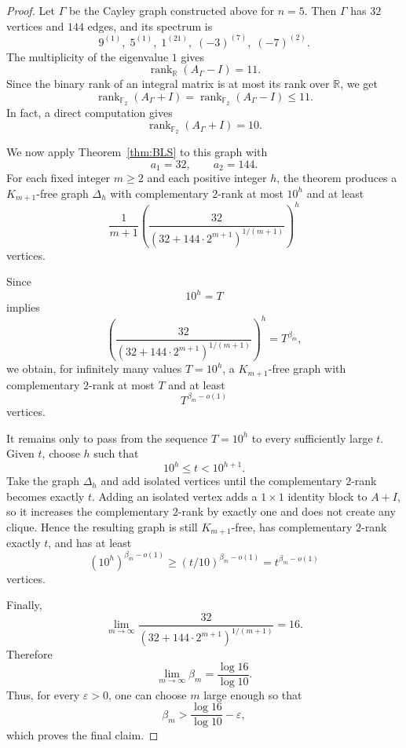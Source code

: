 \documentclass[10pt,a4paper]{amsart}
\begin{document}
\begin{proof}
Let $\Gamma$ be the Cayley graph constructed above for $n=5$. Then $\Gamma$ has
$32$ vertices and $144$ edges, and its spectrum is
\[
9^{(1)},\; 5^{(1)},\; 1^{(21)},\; (-3)^{(7)},\; (-7)^{(2)}.
\]
The multiplicity of the eigenvalue $1$ gives
\[
\operatorname{rank}_{\mathbb R}(A_\Gamma-I)=11.
\]
Since the binary rank of an integral matrix is at most its rank over
$\mathbb R$, we get
\[
\operatorname{rank}_{\mathbb F_2}(A_\Gamma+I)
=
\operatorname{rank}_{\mathbb F_2}(A_\Gamma-I)
\leq 11.
\]
In fact, a direct computation gives
\[
\operatorname{rank}_{\mathbb F_2}(A_\Gamma+I)=10.
\]

We now apply Theorem~\ref{thm:BLS} to this graph with
\[
a_1=32,\qquad a_2=144.
\]
For each fixed integer $m\geq 2$ and each positive integer $h$, the theorem
produces a $K_{m+1}$-free graph $\Delta_h$ with complementary $2$-rank at most
$10^h$ and at least
\[
\frac{1}{m+1}
\left(
\frac{32}{\left(32+144\cdot 2^{m+1}\right)^{1/(m+1)}}
\right)^h
\]
vertices.

Since
\[
10^h = T
\]
implies
\[
\left(
\frac{32}{\left(32+144\cdot 2^{m+1}\right)^{1/(m+1)}}
\right)^h
=
T^{\beta_m},
\]
we obtain, for infinitely many values $T=10^h$, a $K_{m+1}$-free graph with
complementary $2$-rank at most $T$ and at least
\[
T^{\beta_m-o(1)}
\]
vertices.

It remains only to pass from the sequence $T=10^h$ to every sufficiently large
$t$. Given $t$, choose $h$ such that
\[
10^h\leq t<10^{h+1}.
\]
Take the graph $\Delta_h$ and add isolated vertices until the complementary
$2$-rank becomes exactly $t$. Adding an isolated vertex adds a $1\times 1$
identity block to $A+I$, so it increases the complementary $2$-rank by exactly
one and does not create any clique. Hence the resulting graph is still
$K_{m+1}$-free, has complementary $2$-rank exactly $t$, and has at least
\[
(10^h)^{\beta_m-o(1)}
\geq
(t/10)^{\beta_m-o(1)}
=
t^{\beta_m-o(1)}
\]
vertices.

Finally,
\[
\lim_{m\to\infty}
\frac{32}{\left(32+144\cdot 2^{m+1}\right)^{1/(m+1)}}
=
16.
\]
Therefore
\[
\lim_{m\to\infty}\beta_m
=
\frac{\log 16}{\log 10}.
\]
Thus, for every $\varepsilon>0$, one can choose $m$ large enough so that
\[
\beta_m>
\frac{\log 16}{\log 10}-\varepsilon,
\]
which proves the final claim.
\end{proof}
\end{document}
